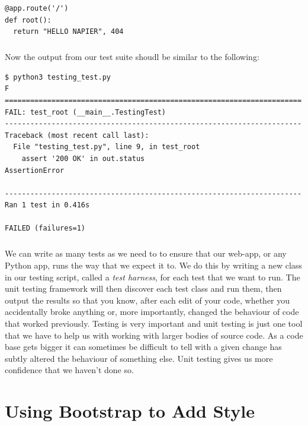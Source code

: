 \documentclass[12pt, a4paper, oneside]{book}
\begin{document}
{\begin{lstlisting}
@app.route('/')
def root():
  return "HELLO NAPIER", 404
\end{lstlisting}

\paragraph{} Now the output from our test suite shoudl be similar to the following:

\begin{lstlisting}[style=DOS]
$ python3 testing_test.py 
F
======================================================================
FAIL: test_root (__main__.TestingTest)
----------------------------------------------------------------------
Traceback (most recent call last):
  File "testing_test.py", line 9, in test_root
    assert '200 OK' in out.status
AssertionError

----------------------------------------------------------------------
Ran 1 test in 0.416s

FAILED (failures=1)
\end{lstlisting}

\paragraph{} We can write as many tests as we need to to ensure that our web-app, or any Python app, runs the way that we expect it to. We do this by writing a new class in our testing script, called a \emph{test harness}, for each test that we want to run. The unit testing framework will then discover each test class and run them, then output the results so that you know, after each edit of your code, whether you accidentally broke anything or, more importantly, changed the behaviour of code that worked previously. Testing is very important and unit testing is just one tool that we have to help us with working with larger bodies of source code. As a code base gets bigger it can sometimes be difficult to tell with a given change has subtly altered the behaviour of something else. Unit testing gives us more confidence that we haven't done so.



\chapter{Using Bootstrap to Add Style}
\label{lab07}
}
\end{document}
